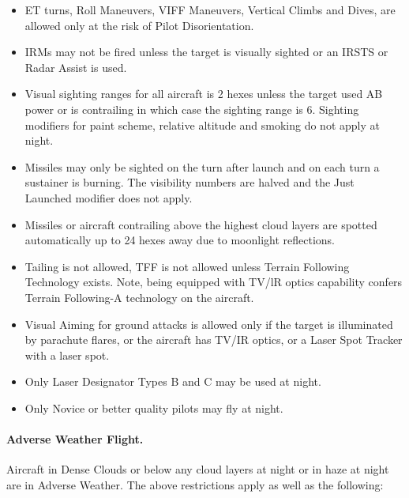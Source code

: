 \begin{advancedrules}
{\begin{itemize}

    \item ET turns, Roll Maneuvers, VIFF Maneuvers, Vertical Climbs and Dives,  are allowed only at the risk of Pilot Disorientation.

    \item IRMs may not be fired unless the target is visually sighted or an IRSTS or Radar Assist is used.

    \item Visual sighting ranges for all aircraft is 2 hexes unless the target used AB power or is contrailing in which case the sighting range is 6. Sighting modifiers for paint scheme, relative altitude and smoking do not apply at night.

    \item Missiles may only be sighted on the turn after launch and on each turn a sustainer is burning. The visibility numbers are halved and the Just Launched modifier does not apply.

    \item Missiles or aircraft contrailing above the highest cloud layers are spotted automatically up to 24 hexes away due to moonlight reflections.

    \item Tailing is not allowed, TFF is not allowed unless Terrain Following Technology exists. Note, being equipped with TV/lR optics capability confers Terrain Following-A technology on the aircraft.

    \item Visual Aiming for ground attacks is allowed only if the target is illuminated by parachute flares, or the aircraft has TV/IR optics, or a Laser Spot Tracker with a laser spot.

    \item Only Laser Designator Types B and C may be used at night.

    \item Only Novice or better quality pilots may fly at night.

\end{itemize}

\paragraph{Adverse Weather Flight.} Aircraft in Dense Clouds or below any cloud layers at night or in haze at night are in Adverse Weather. The above restrictions apply as well as the following:

}
\end{advancedrules}
